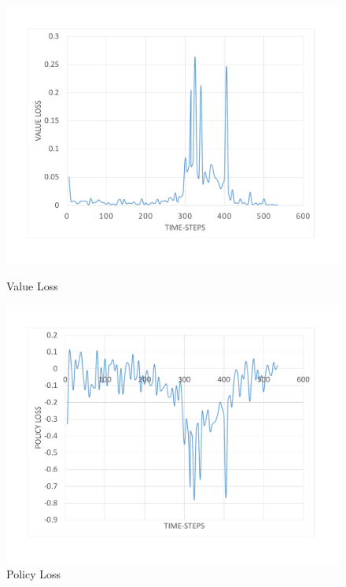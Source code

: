 \begin{figure}[H]
	\advance\leftskip-2cm
	\includegraphics[width=\linewidth]{Figures/ValueLoss}
	\caption{Value Loss}\label{fig:ValueLoss}
	\endminipage\hfill
	\includegraphics[width=\textwidth]{Figures/PolicyLoss}
	\caption{Policy Loss}
	\label{fig:PolicyLoss}
	\endminipage
\end{figure}
